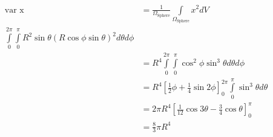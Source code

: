 \begin{align}
\text{var x} &=\frac{1}{\Omega_\text{Sphere}}\int\limits_{\Omega_\text{Sphere}} x^2 dV\\ \int\limits_0^{2\pi}\int\limits_0^\pi R^2\sin\theta \left(R\cos\phi \sin\theta\right)^2 d\theta d\phi\\
&=R^4 \int\limits_0^{2\pi}\int\limits_0^\pi \cos^2\phi \sin^3\theta d\theta d\phi\\
&=R^4 \left[\frac{1}{2}\phi +\frac{1}{4}\sin 2\phi \right]_0^{2\pi}\int\limits_0^\pi \sin^3\theta d\theta \\
&=2\pi R^4 \left[\frac{1}{12}\cos3\theta -\frac{3}{4}\cos\theta \right]_0^\pi\\
&=\frac{8}{3}\pi R^4
\end{align}